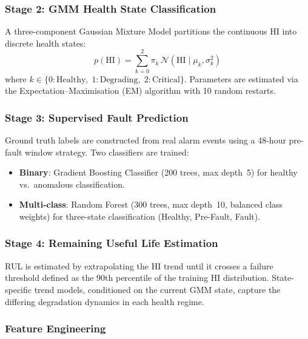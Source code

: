 \documentclass[12pt]{article}
\begin{document}
\subsubsection{Stage 2: GMM Health State Classification}

A three-component Gaussian Mixture Model \citep{McLachlan2000, dempster1977} partitions the continuous HI into discrete health states:
\begin{equation}
    p(\text{HI}) = \sum_{k=0}^{2} \pi_k \, \mathcal{N}(\text{HI} \mid \mu_k, \sigma_k^2)
\end{equation}
where $k \in \{0: \text{Healthy},\; 1: \text{Degrading},\; 2: \text{Critical}\}$.
Parameters are estimated via the Expectation--Maximisation (EM) algorithm with 10 random restarts.

\subsubsection{Stage 3: Supervised Fault Prediction}

Ground truth labels are constructed from real alarm events using a 48-hour pre-fault window strategy.
Two classifiers are trained:
\begin{itemize}[leftmargin=*]
    \item \textbf{Binary}: Gradient Boosting Classifier \citep{friedman2001} (200 trees, max depth~5) for healthy vs.\ anomalous classification.
    \item \textbf{Multi-class}: Random Forest \citep{breiman2001} (300 trees, max depth~10, balanced class weights) for three-state classification (Healthy, Pre-Fault, Fault).
\end{itemize}

\subsubsection{Stage 4: Remaining Useful Life Estimation}

RUL is estimated by extrapolating the HI trend until it crosses a failure threshold defined as the 90th percentile of the training HI distribution.
State-specific trend models, conditioned on the current GMM state, capture the differing degradation dynamics in each health regime.

\subsubsection{Feature Engineering}
\end{document}
